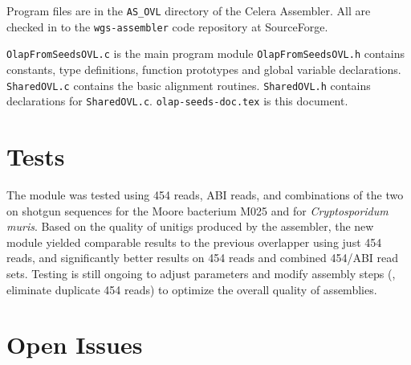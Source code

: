 \documentclass[letterpaper,11pt]{article}
\def\Pgm#1{\texttt{#1}}
\begin{document}
Program files are in the \Pgm{AS\_OVL} directory of the Celera
Assembler.  All are checked in to the \verb`wgs-assembler` code
repository at SourceForge.

\bi
\exdent
  \Pgm{OlapFromSeedsOVL.c} is the main program module
\exdent
  \Pgm{OlapFromSeedsOVL.h} contains constants, type definitions,
  function prototypes and global variable declarations.
\exdent
  \Pgm{SharedOVL.c} contains the basic alignment routines.
\exdent
  \Pgm{SharedOVL.h} contains declarations for \Pgm{SharedOVL.c}.
\exdent
  \Pgm{olap-seeds-doc.tex} is this document.
\ei


\section{Tests}

The module was tested using 454 reads, ABI reads, and combinations of
the two on shotgun sequences for the Moore bacterium M025 and for
\emph{Cryptosporidum muris}.  Based on the quality of unitigs
produced by the assembler, the new module yielded comparable results
to the previous overlapper using just 454 reads, and significantly
better results on 454 reads and combined 454/ABI read sets.  Testing
is still ongoing to adjust parameters and modify assembly steps (\eg,
eliminate duplicate 454 reads) to optimize the overall quality of
assemblies.


\section{Open Issues}
\end{document}
